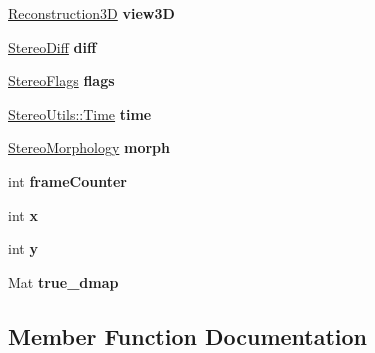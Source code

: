 \begin{DoxyCompactItemize}
\item 
\hyperlink{class_reconstruction3_d}{Reconstruction3D} {\bfseries view3D}\hypertarget{class_stereo_processor_a7f8c7fe5174d8dc8b99c2dad65758cdd}{}\label{class_stereo_processor_a7f8c7fe5174d8dc8b99c2dad65758cdd}

\item 
\hyperlink{class_stereo_diff}{Stereo\+Diff} {\bfseries diff}\hypertarget{class_stereo_processor_ad478da46fc5ab3ceac829165c838c864}{}\label{class_stereo_processor_ad478da46fc5ab3ceac829165c838c864}

\item 
\hyperlink{class_stereo_flags}{Stereo\+Flags} {\bfseries flags}\hypertarget{class_stereo_processor_a73e03785c78e6ab79d6d8951378a29ed}{}\label{class_stereo_processor_a73e03785c78e6ab79d6d8951378a29ed}

\item 
\hyperlink{class_stereo_utils_1_1_time}{Stereo\+Utils\+::\+Time} {\bfseries time}\hypertarget{class_stereo_processor_af8c3d91de1990ce04e4c5d6f49c5c37e}{}\label{class_stereo_processor_af8c3d91de1990ce04e4c5d6f49c5c37e}

\item 
\hyperlink{class_stereo_morphology}{Stereo\+Morphology} {\bfseries morph}\hypertarget{class_stereo_processor_a76bd7c120eb2ed266d69717bdb6d5aa6}{}\label{class_stereo_processor_a76bd7c120eb2ed266d69717bdb6d5aa6}

\item 
int {\bfseries frame\+Counter}\hypertarget{class_stereo_processor_ad33af3a32f3b3e1b9c1e0a9b6a7e5f0a}{}\label{class_stereo_processor_ad33af3a32f3b3e1b9c1e0a9b6a7e5f0a}

\item 
int {\bfseries x}\hypertarget{class_stereo_processor_a2afa82e29b04e9d3718f6fef951aea28}{}\label{class_stereo_processor_a2afa82e29b04e9d3718f6fef951aea28}

\item 
int {\bfseries y}\hypertarget{class_stereo_processor_a6b05bbc10ad304546804682d9aaa92ad}{}\label{class_stereo_processor_a6b05bbc10ad304546804682d9aaa92ad}

\item 
Mat {\bfseries true\+\_\+dmap}\hypertarget{class_stereo_processor_aa40150970588c5cbe44e890fdf51a86f}{}\label{class_stereo_processor_aa40150970588c5cbe44e890fdf51a86f}

\end{DoxyCompactItemize}


\subsection{Member Function Documentation}
